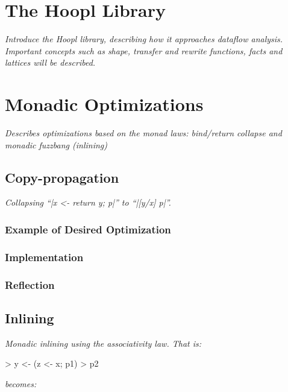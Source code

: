 \documentclass[12pt]{report}
\begin{document}
\VerbatimFootnotes
\DefineShortVerb{\#}
\doublespacing
             










\chapter{The Hoopl Library}

\emph{Introduce the Hoopl library, describing how
it approaches dataflow analysis. Important concepts
such as shape, transfer and rewrite functions, facts and
lattices will be described. }





\chapter{Monadic Optimizations}
\emph{Describes optimizations based on the monad laws: bind/return collapse and
  monadic fuzzbang (inlining)}

\section{Copy-propagation}
\emph{Collapsing ``|x <- return y; p|'' to ``|[y/x] p|''.}
\subsection{Example of Desired Optimization}
\subsection{Implementation}
\subsection{Reflection}

\section{Inlining}
\emph{Monadic inlining using the associativity law. That is:}

> y <- (z <- x; p1)
> p2

\noindent
\emph{becomes:}
\end{document}
